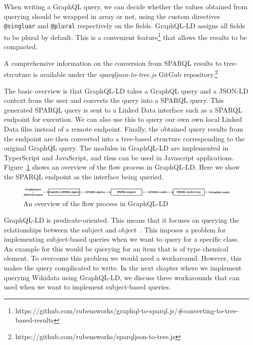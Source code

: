 When writing a GraphQL query, we can decide whether the values obtained from querying should be wrapped in array or not, using the custom directives \texttt{@singluar} and \texttt{@plural} respectively on the fields. GraphQL-LD assigns all fields to be plural by default. This is a convenient feature\footnote{https://github.com/rubensworks/graphql-to-sparql.js/\#converting-to-tree-based-results} that allows the results to be compacted.

A comprehensive information on the conversion from SPARQL results to tree-strcuture is available under the \textit{sparqljson-to-tree.js} GitGub repository.\footnote{https://github.com/rubensworks/sparqljson-to-tree.js}

The basic overview is that GraphQL-LD takes a GraphQL query and a JSON-LD context from the user and converts the query into a SPARQL query. This generated SPARQL query is sent to a Linked Data interface such as a SPARQL endpoint for execution. We can also use this to query our own own local Linked Data files instead of a remote endpoint. Finally, the obtained query results from the endpoint are then converted into a tree-based structure corresponding to the original GraphQL query. The modules in GraphQL-LD are implemented in TyperScript and JavaScript, and thus can be used in Javascript applications. Figure~\ref{fig:8} shows an overview of the flow process in GraphQL-LD. Here we show the SPARQL endpoint as the interface being queried. 


\begin{figure}[h]
  \centering
  \includegraphics[width=0.80\linewidth]{images/graphql_overview.drawio.pdf}
  \caption{An overview of the flow process in GraphQL-LD}
  \label{fig:8}
\end{figure}

GraphQL-LD is predicate-oriented. This means that it focuses on querying the relationships between the subject and object~\cite{Werbrouck2019a}. This imposes a problem for implementing subject-based queries when we want to query for a specific class. An example for this would be querying for an item that is of type chemical element. To overcome this problem we would need a workaround. However, this makes the query complicated to write. In the next chapter where we implement querying Wikidata using GraphQL-LD, we discuss three workarounds that can used when we want to implement subject-based queries. 

